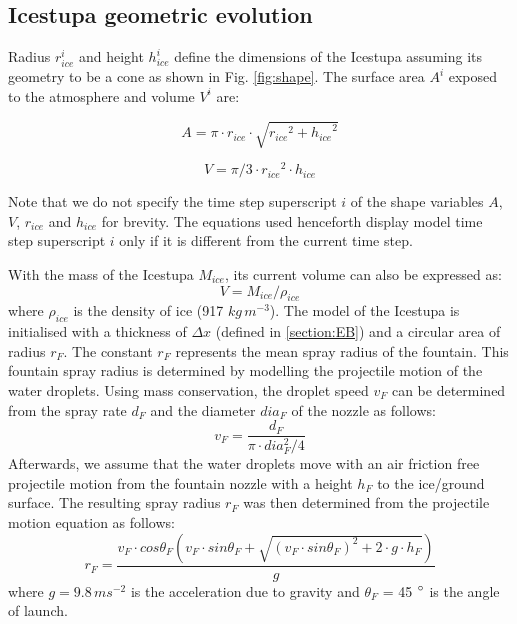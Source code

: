\documentclass[utf8]{frontiersSCNS} %
\begin{document}
\subsection{Icestupa geometric evolution}

Radius $r_{ice}^i$ and height $h_{ice}^i$ define the dimensions of the Icestupa assuming its geometry to be a cone as
shown in Fig. \ref{fig:shape}. The surface area $A^i$ exposed to the atmosphere and volume $V^i$ are:

\begin{equation} A = \pi \cdot r_{ice} \cdot \sqrt{{r_{ice}}^2 + {h_{ice}}^ 2} \label{eqn:A} \end{equation}

\begin{equation} V = \pi/3 \cdot {r_{ice}}^2 \cdot h_{ice} \label{eqn:V} \end{equation}

Note that we do not specify the time step superscript $i$ of the shape variables $A$, $V$, $r_{ice}$ and $h_{ice}$ for
brevity.  The equations used henceforth display model time step superscript $i$ only if it is different from the
current time step.

With the mass of the Icestupa $M_{ice}$, its current volume can also be expressed as:
\begin{equation} V = M_{ice} / \rho_{ice} \label{eqn:V1} \end{equation} where $\rho_{ice}$ is the density of ice (917
$kg\, m^{-3}$). The model of the Icestupa is initialised with a thickness of $\Delta x$ (defined in \ref{section:EB})
and a circular area of radius $r_F$. The constant $r_F$ represents the mean spray radius of the fountain.  This fountain
spray radius is determined by modelling the projectile motion of the water droplets. Using mass conservation, the
droplet speed $v_F$ can be determined from the spray rate $d_F$ and the diameter $dia_F$ of the nozzle as
follows:\begin{equation} v_F = \frac{d_F}{\pi \cdot dia_F^2/4} \end{equation}Afterwards, we assume that the water
droplets move with an air friction free projectile motion from the fountain nozzle with a height $h_F$ to the ice/ground
surface. The resulting spray radius $r_F$ was then determined from the projectile motion equation as
follows:\begin{equation} r_F = \frac{v_F \cdot cos\theta_F (v_F \cdot sin\theta_F + \sqrt{(v_F \cdot sin\theta_F)^{2} +
2 \cdot g \cdot h_F})}{g} \end{equation}where $g = 9.8\, m s^{-2}$ is the acceleration due to gravity and $\theta_F$ =
45 $\degree$ is the angle of launch.
\end{document}

